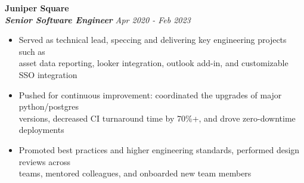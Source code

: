 \documentclass[]{resume}
\newcommand\tab[1][.5cm]{\hspace*{#1}}
\begin{document}
\begin{resume}
\vspace{0.9mm}
\textbf{\large Juniper Square}\\
\tab \textbf{\textit{Senior Software Engineer}} \hfill \textit{Apr 2020 - Feb 2023}
\begin{itemize}
    \item
    Served as technical lead, speccing and delivering key engineering projects such as \\
    asset data reporting, looker integration, outlook add-in, and customizable SSO integration
    \item Pushed for continuous improvement: coordinated the upgrades of major python/postgres \\
    versions, decreased CI turnaround time by 70\%+, and drove zero-downtime deployments
    \item
    Promoted best practices and higher engineering standards, performed design reviews across \\
    teams, mentored colleagues, and onboarded new team members
\end{itemize}



\end{resume}
\end{document}
